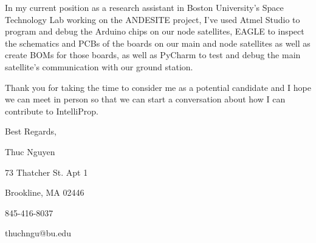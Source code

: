 \documentclass{article}
\begin{document}
\vspace{.6em}
In my current position as a research assistant in Boston University's Space Technology Lab working on the ANDESITE project, I've used Atmel Studio to program and debug the Arduino chips on our node satellites, EAGLE to inspect the schematics and PCBs of the boards on our main and node satellites as well as create BOMs for those boards, as well as PyCharm to test and debug the main satellite's communication with our ground station.

\vspace{.6em}
Thank you for taking the time to consider me as a potential candidate and I hope we can meet in person so that we can start a conversation about how I can contribute to IntelliProp.

\begin{flushleft}
\vspace{1.6em}
Best Regards,

\vspace{1em}

Thuc Nguyen

73 Thatcher St. Apt 1

Brookline, MA 02446

845-416-8037

thuchngu@bu.edu

\end{flushleft}
\end{document}
